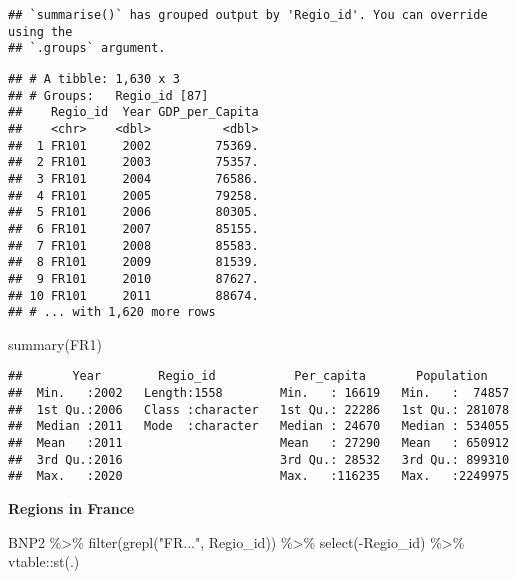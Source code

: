 \documentclass[
]{article}
\newenvironment{Shaded}{\begin{snugshade}}{\end{snugshade}}
\newcommand{\FunctionTok}[1]{\textcolor[rgb]{0.00,0.00,0.00}{#1}}
\newcommand{\NormalTok}[1]{#1}
\newcommand{\SpecialCharTok}[1]{\textcolor[rgb]{0.00,0.00,0.00}{#1}}
\newcommand{\StringTok}[1]{\textcolor[rgb]{0.31,0.60,0.02}{#1}}
\begin{document}
\begin{verbatim}
## `summarise()` has grouped output by 'Regio_id'. You can override using the
## `.groups` argument.
\end{verbatim}

\begin{verbatim}
## # A tibble: 1,630 x 3
## # Groups:   Regio_id [87]
##    Regio_id  Year GDP_per_Capita
##    <chr>    <dbl>          <dbl>
##  1 FR101     2002         75369.
##  2 FR101     2003         75357.
##  3 FR101     2004         76586.
##  4 FR101     2005         79258.
##  5 FR101     2006         80305.
##  6 FR101     2007         85155.
##  7 FR101     2008         85583.
##  8 FR101     2009         81539.
##  9 FR101     2010         87627.
## 10 FR101     2011         88674.
## # ... with 1,620 more rows
\end{verbatim}

\begin{Shaded}
\begin{Highlighting}[]
\FunctionTok{summary}\NormalTok{(FR1)}
\end{Highlighting}
\end{Shaded}

\begin{verbatim}
##       Year        Regio_id           Per_capita       Population     
##  Min.   :2002   Length:1558        Min.   : 16619   Min.   :  74857  
##  1st Qu.:2006   Class :character   1st Qu.: 22286   1st Qu.: 281078  
##  Median :2011   Mode  :character   Median : 24670   Median : 534055  
##  Mean   :2011                      Mean   : 27290   Mean   : 650912  
##  3rd Qu.:2016                      3rd Qu.: 28532   3rd Qu.: 899310  
##  Max.   :2020                      Max.   :116235   Max.   :2249975
\end{verbatim}

\textbf{Regions in France}

\begin{Shaded}
\begin{Highlighting}[]
\NormalTok{BNP2 }\SpecialCharTok{\%\textgreater{}\%}
  \FunctionTok{filter}\NormalTok{(}\FunctionTok{grepl}\NormalTok{(}\StringTok{"FR..."}\NormalTok{, Regio\_id)) }\SpecialCharTok{\%\textgreater{}\%}
  \FunctionTok{select}\NormalTok{(}\SpecialCharTok{{-}}\NormalTok{Regio\_id) }\SpecialCharTok{\%\textgreater{}\%}
\NormalTok{  vtable}\SpecialCharTok{::}\FunctionTok{st}\NormalTok{(.)}
\end{Highlighting}
\end{Shaded}
\end{document}
